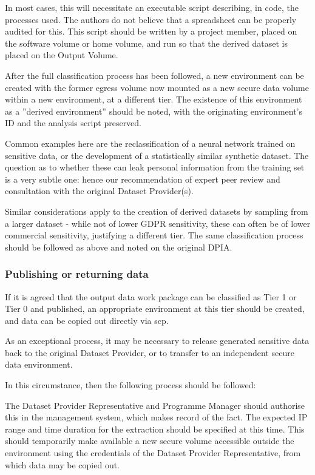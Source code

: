 \documentclass[10pt,a4paper,twocolumn]{article}
\begin{document}
In most cases, this will necessitate an executable script describing, in code, the processes used. The authors do not believe that a spreadsheet can be properly audited for this. This script should be written by a project member, placed on the software volume or home volume, and run so that the derived
dataset is placed on the Output Volume.

After the full classification process has been followed, a new environment can be created with the former egress volume now mounted as a new secure data volume within a new environment, at a different tier. The existence of this environment as a ''derived environment'' should be noted, with the originating  environment's ID and the analysis script preserved.

Common examples here are the reclassification of a neural network trained on sensitive data, or the development of a statistically similar synthetic dataset. The question as to whether these can leak personal information from the training set is a very subtle one: hence our recommendation of expert peer review and consultation with the original Dataset Provider(s).

Similar considerations apply to the creation of derived datasets by sampling from a larger dataset - while not of lower GDPR sensitivity, these can often be of lower commercial sensitivity, justifying a different tier. The same classification process should be followed as above and noted on the original DPIA.

\subsubsection{Publishing or returning data}
\label{sec:egress}

If it is agreed that the output data work package can be classified as Tier 1 or Tier 0 and published, an appropriate environment at this tier should be created, and data can be copied out directly via scp.

As an exceptional process, it may be necessary to release generated
sensitive data back to the original Dataset Provider, or to transfer to an
independent secure data environment.

In this circumstance, then the following process should be followed:

The Dataset Provider Representative and Programme Manager should authorise this in the management system,
which makes record of the fact. The expected IP range and time duration for the extraction should be specified at this time. This should temporarily make available a new secure volume accessible outside the environment using 
the credentials of the Dataset Provider Representative, from which data may be copied out.
\end{document}
